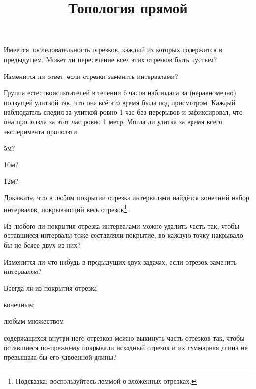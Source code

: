 \documentclass[a4paper, 12pt, num=28]{listok}
\begin{document}
\title{Топология прямой}
\maketitle{}
\begin{problem}\label{subsec}
	Имеется последовательность отрезков, каждый из которых содержится в предыдущем.
	Может ли пересечение всех этих отрезков быть пустым?
\end{problem}
\begin{problem}
	Изменится ли ответ, если отрезки заменить интервалами?
\end{problem}
\begin{problem}
	Группа естествоиспытателей в течении 6 часов наблюдала за (неравномерно) ползущей улиткой так,
	что она всё это время была под присмотром.
	Каждый наблюдатель следил за улиткой ровно 1 час без перерывов и зафиксировал, что она проползла за этот
	час ровно 1 метр. Могла ли улитка за время всего эксперимента проползти
	\begin{probparts}
		\item 5м?
		\item 10м?
		\item 12м?
	\end{probparts}
\end{problem}
\begin{problem}\label{coversec}
	Докажите, что в любом покрытии отрезка интервалами найдётся конечный набор интервалов, покрывающий весь отрезок\footnote{%
		Подсказка: воспользуйтесь леммой о вложенных отрезках.
	}.
\end{problem}
\begin{problem}
	Из любого ли покрытия отрезка интервалами можно удалить часть так, чтобы оставшиеся интервалы тоже составляли покрытие,
	но каждую точку накрывало бы не более двух из них?
\end{problem}
\begin{problem}
	Изменится ли что-нибудь в предыдущих двух задачах, если отрезок заменить интервалом?
\end{problem}
\begin{problem}
	Всегда ли из покрытия отрезка 
	\begin{probparts}
		\item конечным;
		\item любым множеством
	\end{probparts}
	содержащихся внутри него отрезков можно выкинуть часть отрезков так,
	чтобы оставшиеся по-прежнему покрывали исходный отрезок и их суммарная длина не превышала бы его удвоенной длины?
\end{problem}
\end{document}
